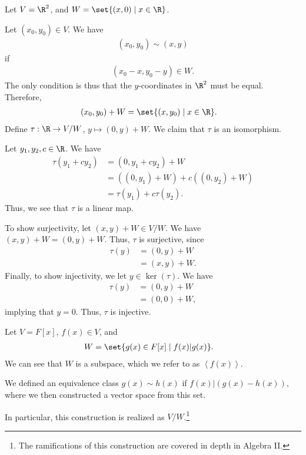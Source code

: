 \documentclass[10pt]{mypackage}
\begin{document}
\begin{example}
  Let $V = \R^2$, and $W = \set{\left(x,0\right)\mid x\in \R}$.\newline

  Let $\left(x_0,y_0\right)\in V$. We have
  \begin{align*}
  \left(x_0,y_0\right) \sim \left(x,y\right)
  \end{align*}
  if
  \begin{align*}
    \left(x_0 - x,y_0 - y\right)\in W.
  \end{align*}
  The only condition is thus that the $y$-coordinates in $\R^2$ must be equal. Therefore,
  \begin{align*}
    \left(x_0,y_0\right) + W &= \set{(x,y_0)\mid x\in\R}.
  \end{align*}
  Define $\tau: \R\rightarrow V/W$, $y\mapsto \left(0,y\right) + W$. We claim that $\tau$ is an isomorphism.\newline

  Let $y_1,y_2,c\in\R$. We have
  \begin{align*}
    \tau\left(y_1 + cy_2\right) &= \left(0,y_1 + cy_2\right) + W\\
                                &= \left(\left(0,y_1\right) + W\right) + c\left(\left(0,y_2\right) + W\right)\\
                                &= \tau\left(y_1\right) + c\tau\left(y_2\right).
  \end{align*}
  Thus, we see that $\tau$ is a linear map.\newline

  To show surjectivity, let $\left(x,y\right) + W\in V/W$. We have $\left(x,y\right) + W = \left(0,y\right) + W$. Thus, $\tau$ is surjective, since
  \begin{align*}
    \tau\left(y\right) &= \left(0,y\right) + W\\
                       &= \left(x,y\right) + W.
  \end{align*}
  Finally, to show injectivity, we let $y\in\ker\left(\tau\right)$. We have
  \begin{align*}
    \tau\left(y\right) &= \left(0,y\right) + W\\
                       &= \left(0,0\right) + W,
  \end{align*}
  implying that $y = 0$. Thus, $\tau$ is injective.
\end{example}
\begin{example}
  Let $V = F[x]$, $f(x) \in V$, and
  \begin{align*}
    W &= \set{g(x)\in F[x]\mid f(x)|g(x)}.
  \end{align*}
  We can see that $W$ is a subspace, which we refer to as $\left\langle f(x) \right\rangle$.\newline

  We defined an equivalence class $g(x) \sim h(x)$ if $f(x) | \left(g(x) - h(x)\right)$, where we then constructed a vector space from this set.\newline

  In particular, this construction is realized as $V/W$.\footnote{The ramifications of this construction are covered in depth in Algebra II.}
\end{example}
\end{document}
